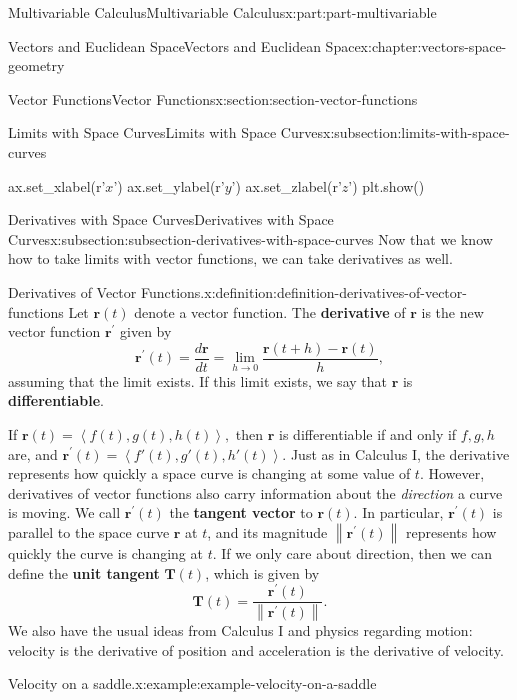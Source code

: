 \documentclass[twoside,10pt,]{book}
\newcommand{\terminology}[1]{\textbf{#1}}
\numberwithin{equation}{part}
\newcommand{\norm}[1]{\left\| #1 \right\|}
\newcommand{\dotprod}[1]{\left\langle #1 \right\rangle}
\begin{document}
\begin{partptx}{Multivariable Calculus}{}{Multivariable Calculus}{}{}{x:part:part-multivariable}
\begin{chapterptx}{Vectors and Euclidean Space}{}{Vectors and Euclidean Space}{}{}{x:chapter:vectors-space-geometry}
\begin{sectionptx}{Vector Functions}{}{Vector Functions}{}{}{x:section:section-vector-functions}
\begin{subsectionptx}{Limits with Space Curves}{}{Limits with Space Curves}{}{}{x:subsection:limits-with-space-curves}
\begin{sageinput}
ax.set_xlabel(r'$x$')
ax.set_ylabel(r'$y$')
ax.set_zlabel(r'$z$')
plt.show()
\end{sageinput}
\end{subsectionptx}
%
%
\typeout{************************************************}
\typeout{************************************************}
%
\begin{subsectionptx}{Derivatives with Space Curves}{}{Derivatives with Space Curves}{}{}{x:subsection:subsection-derivatives-with-space-curves}
Now that we know how to take limits with vector functions, we can take derivatives as well.%
\begin{definition}{Derivatives of Vector Functions.}{x:definition:definition-derivatives-of-vector-functions}%
%
Let \(\mathbf{r}(t)\) denote a vector function. The \terminology{derivative} of \(\mathbf{r}\) is the new vector function \(\mathbf{r}^\prime\) given by%
%
\begin{equation*}
\mathbf{r}^\prime(t) = \frac{d\mathbf{r}}{dt} = \lim_{h\to0}\frac{\mathbf{r}(t+h)-\mathbf{r}(t)}{h},
\end{equation*}
assuming that the limit exists. If this limit exists, we say that \(\mathbf{r}\) is \terminology{differentiable}.%
\end{definition}
If \(\mathbf{r}(t) = \dotprod{f(t),g(t),h(t)},\) then \(\mathbf{r}\) is differentiable if and only if \(f,g,h\) are, and \(\mathbf{r}^\prime(t) = \dotprod{f'(t),g'(t),h'(t)}.\) Just as in Calculus I, the derivative represents how quickly a space curve is changing at some value of \(t\). However, derivatives of vector functions also carry information about the \emph{direction} a curve is moving. We call \(\mathbf{r}^\prime(t)\) the \terminology{tangent vector} to \(\mathbf{r}(t)\). In particular, \(\mathbf{r}^\prime(t)\) is parallel to the space curve \(\mathbf{r}\) at \(t\), and its magnitude \(\norm{\mathbf{r}^\prime(t)}\) represents how quickly the curve is changing at \(t\). If we only care about direction, then we can define the \terminology{unit tangent} \(\mathbf{T}(t)\), which is given by%
%
\begin{equation*}
\mathbf{T}(t) = \frac{\mathbf{r}^\prime(t)}{\norm{\mathbf{r}^\prime(t)}}.
\end{equation*}
We also have the usual ideas from Calculus I and physics regarding motion: velocity is the derivative of position and acceleration is the derivative of velocity.%
\begin{example}{Velocity on a saddle.}{x:example:example-velocity-on-a-saddle}%

\end{example}
\end{subsectionptx}
\end{sectionptx}
\end{chapterptx}
\end{partptx}
\end{document}
